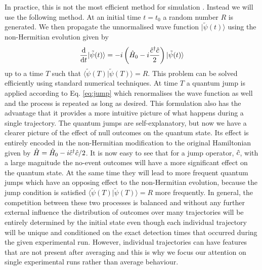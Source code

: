 In practice, this is not the most efficient method for simulation
\cite{MeasurementControl}. Instead we will use the following
method. At an initial time $t = t_0$ a random number $R$ is
generated. We then propagate the unnormalised wave function
$| \tilde{\psi} (t) \rangle$ using the non-Hermitian evolution given
by
\begin{equation}
  \frac{\mathrm{d}}{\mathrm{d}t} | \tilde{\psi} (t) \rangle = -i
  \left( \hat{H}_0 - i \frac{\hat{c}^\dagger \hat{c}}{2} \right) | \tilde{\psi} (t) \rangle
\end{equation}
up to a time $T$ such that
$\langle \tilde{\psi} (T) | \tilde{\psi} (T) \rangle = R$. This
problem can be solved efficiently using standard numerical
techniques. At time $T$ a quantum jump is applied according to
Eq. \eqref{eq:jump} which renormalises the wave function as well and
the process is repeated as long as desired. This formulation also has
the advantage that it provides a more intuitive picture of what
happens during a single trajectory. The quantum jumps are
self-explanatory, but now we have a clearer picture of the effect of
null outcomes on the quantum state. Its effect is entirely encoded in
the non-Hermitian modification to the original Hamiltonian given by
$\hat{H} = \hat{H}_0 - i \hat{c}^\dagger \hat{c} / 2$. It is now easy to see that for a
jump operator, $\hat{c}$, with a large magnitude the no-event outcomes will
have a more significant effect on the quantum state. At the same time
they will lead to more frequent quantum jumps which have an opposing
effect to the non-Hermitian evolution, because the jump condition is
satisfied $\langle \tilde{\psi} (T) | \tilde{\psi} (T) \rangle = R$
more frequently. In general, the competition between these two
processes is balanced and without any further external influence the
distribution of outcomes over many trajectories will be entirely
determined by the initial state even though each individual trajectory
will be unique and conditioned on the exact detection times that
occurred during the given experimental run. However, individual
trajectories can have features that are not present after averaging
and this is why we focus our attention on single experimental runs
rather than average behaviour.

